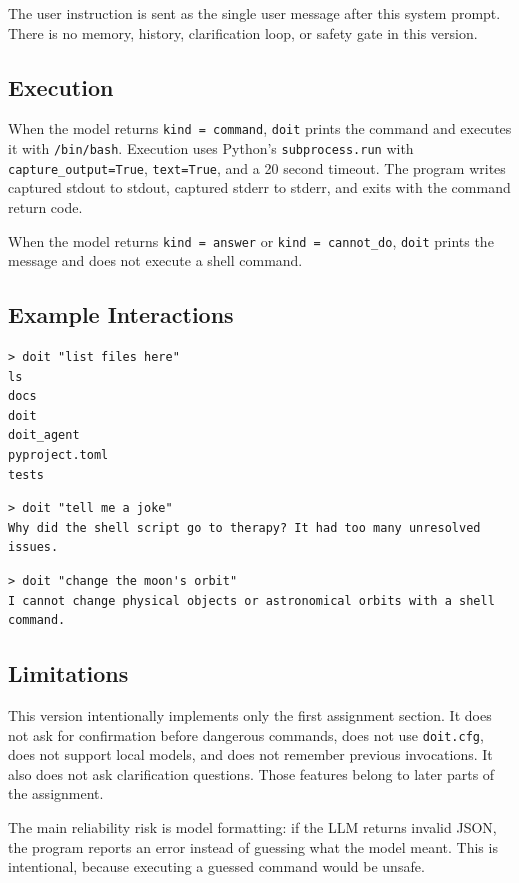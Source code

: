 The user instruction is sent as the single user message after this system
prompt. There is no memory, history, clarification loop, or safety gate in this
version.

\subsection{Execution}

When the model returns \texttt{kind = command}, \texttt{doit} prints the command
and executes it with \texttt{/bin/bash}. Execution uses Python's
\texttt{subprocess.run} with \texttt{capture\_output=True}, \texttt{text=True},
and a 20 second timeout. The program writes captured stdout to stdout, captured
stderr to stderr, and exits with the command return code.

When the model returns \texttt{kind = answer} or \texttt{kind = cannot\_do},
\texttt{doit} prints the message and does not execute a shell command.

\subsection{Example Interactions}

\begin{verbatim}
> doit "list files here"
ls
docs
doit
doit_agent
pyproject.toml
tests
\end{verbatim}

\begin{verbatim}
> doit "tell me a joke"
Why did the shell script go to therapy? It had too many unresolved issues.
\end{verbatim}

\begin{verbatim}
> doit "change the moon's orbit"
I cannot change physical objects or astronomical orbits with a shell command.
\end{verbatim}

\subsection{Limitations}

This version intentionally implements only the first assignment section. It does
not ask for confirmation before dangerous commands, does not use \texttt{doit.cfg},
does not support local models, and does not remember previous invocations. It
also does not ask clarification questions. Those features belong to later parts
of the assignment.

The main reliability risk is model formatting: if the LLM returns invalid JSON,
the program reports an error instead of guessing what the model meant. This is
intentional, because executing a guessed command would be unsafe.

